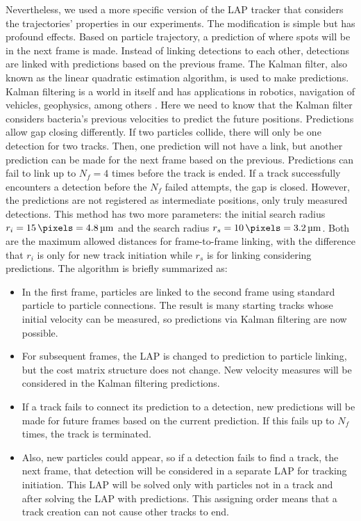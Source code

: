 Nevertheless, we used a more specific version of the LAP tracker that considers the trajectories' properties in our experiments. The modification is simple but has profound effects. Based on particle trajectory, a prediction of where spots will be in the next frame is made. Instead of linking detections to each other, detections are linked with predictions based on the previous frame. The Kalman filter, also known as the linear quadratic estimation algorithm, is used to make predictions. Kalman filtering is a world in itself and has applications in robotics, navigation of vehicles,  geophysics, among others \cite{Auger2013IndustrialReview,Aanonsen2009TheReview}. Here we need to know that the Kalman filter considers bacteria's previous velocities to predict the future positions. Predictions allow gap closing differently. If two particles collide, there will only be one detection for two tracks. Then, one prediction will not have a link, but another prediction can be made for the next frame based on the previous. Predictions can fail to link up to $N_f=4$ times before the track is ended. If a track successfully encounters a detection before the $N_f$ failed attempts, the gap is closed. However, the predictions are not registered as intermediate positions, only truly measured detections. This method has two more parameters: the initial search radius $r_i=\SI{15}{\pixels}=\SI{4.8}{\micro\meter}$ and the search radius $r_s=\SI{10}{\pixels}=\SI{3.2}{\micro\meter}$. Both are the maximum allowed distances for frame-to-frame linking, with the difference that $r_i$ is only for new track initiation while $r_s$ is for linking considering predictions. The algorithm is briefly summarized as:

\begin{itemize}
	\item In the first frame, particles are linked to the second frame using standard particle to particle connections. The result is many starting tracks whose initial velocity can be measured, so predictions via Kalman filtering are now possible.
	\item For subsequent frames, the LAP is changed to prediction to particle linking, but the cost matrix structure does not change. New velocity measures will be considered in the Kalman filtering predictions.
	\item If a track fails to connect its prediction to a detection, new predictions will be made for future frames based on the current prediction. If this fails up to $N_f$ times, the track is terminated.
	\item Also, new particles could appear, so if a detection fails to find a track, the next frame, that detection will be considered in a separate LAP for tracking initiation. This LAP will be solved only with particles not in a track and after solving the LAP with predictions. This assigning order means that a track creation can not cause other tracks to end.
\end{itemize}

